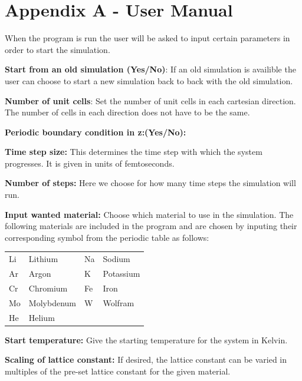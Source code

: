 \documentclass[12pt,a4paper]{article}
\begin{document}
\newpage

\section*{Appendix A - User Manual}

\label{sec:AppendixA}
When the program is run the user will be asked to input certain parameters in order to start the simulation.

\textbf{Start from an old simulation (Yes/No)}: If an old simulation is availible the user can choose to start a new simulation back to back with the old simulation.  

\textbf{Number of unit cells}: Set the number of unit cells in each cartesian direction. The number of cells in each direction does not have to be the same.

\textbf{Periodic boundary condition in z:(Yes/No):} 

\textbf{Time step size:} This determines the time step with which the system progresses. It is given in units of femtoseconds.

\textbf{Number of steps:} Here we choose for how many time steps the simulation will run.

\textbf{Input wanted material:} Choose which material to use in the simulation. The following materials are included in the program and are chosen by inputing their corresponding symbol from the periodic table as follows:

\begin{table}[h]
\begin{center}
\begin{tabular}{l l | l l}
Li & Lithium & Na & Sodium \\
Ar & Argon & K & Potassium \\
Cr & Chromium & Fe & Iron \\
Mo & Molybdenum & W & Wolfram \\
He & Helium & & \\
\end{tabular}
\end{center}
\end{table}


\textbf{Start temperature:} Give the starting temperature for the system in Kelvin.

\textbf{Scaling of lattice constant: }If desired, the lattice constant can be varied in multiples of the pre-set lattice constant for the given material. 
\end{document}
